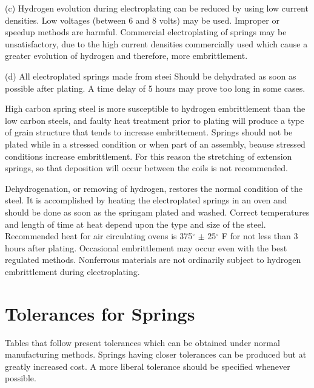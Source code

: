 \documentclass[10pt]{article}
\begin{document}
(c) Hydrogen evolution during electroplating can be reduced by using low current densities.
Low voltages (between 6 and 8 volts) may be used. 
Improper or speedup methods are harmful. 
Commercial electroplating of springs may be unsatisfactory, due to the high current densities commercially used which cause a greater evolution of hydrogen and therefore, more embrittlement.

(d) All electroplated springs made from steei Should be dehydrated as soon as possible after plating. 
A time delay of 5 hours may prove too long in some cases.

High carbon spring steel is more susceptible to hydrogen embrittlement than the low carbon steels, and faulty heat treatment prior to plating will produce a type of grain structure that tends to increase embrittement.
Springs should not be plated while in a stressed condition or when part of an assembly, beause stressed conditions increase embrittlement.
For this reason the stretching of extension springs, so that deposition will occur between the coils is not recommended.

Dehydrogenation, or removing of hydrogen, restores the normal condition of the steel. 
It is accomplished by heating the electroplated springs in an oven and should be done as soon as the springam plated and
washed. 
Correct temperatures and length of time at heat depend upon the type and size of the steel. 
Recommended heat for air circulating ovens is 375$^\circ$ $\pm$ 25$^\circ$ F for not less than 3 hours after plating.
Occasional embrittlement may occur even with the best regulated methods. 
Nonferrous materials are not ordinarily subject to hydrogen embrittlement during electroplating.

\section{Tolerances for Springs} %
Tables that follow present tolerances which can be obtained under normal manufacturing methods. 
Springs having closer tolerances can be produced but at greatly increased cost.
A more liberal tolerance should be specified whenever possible.
\end{document}
